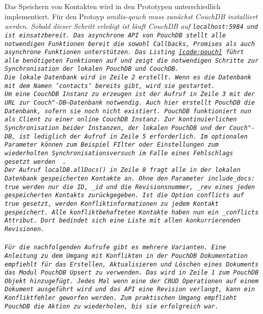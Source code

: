 Das Speichern von Kontakten wird in den Prototypen unterschiedlich implementiert.
%
%
Für den Protoyp \it{amilia-qouch} muss zunächst CouchDB installiert werden.
Sobald dieser Schritt erledigt ist läuft CouchDB auf \tt{localhost:5984} und ist einsatzbereit.
Das asynchrone \gls{API} von PouchDB stellt alle notwendigen Funktionen bereit die sowohl Callbacks, Promises als auch asynchrone Funktionen unterstützen. 
Das Listing \ref{code:pouch} führt alle benötigeten Funktionen auf und zeigt die notwendigen Schritte zur Synchronisation der lokalen PouchDB und CouchDB.\\
Die lokale Datenbank wird in Zeile 2 erstellt. Wenn es die Datenbank mit dem Namen `contacts` bereits gibt, wird sie gestartet.\\
Um eine CouchDB Instanz zu erzeugen ist der Aufruf in Zeile 3 mit der URL zur Couch"-DB--Datenbank notwendig. Auch hier erstellt PouchDB die Datenbank, sofern sie noch nicht existiert. PouchDB funktioniert nun als Client zu einer online CouchDB Instanz.
Zur kontinuierlichen Synchronisation beider Instanzen, der lokalen PouchDB und der Couch"-DB, ist lediglich der Aufruf in Zeile 5 erforderlich. Im optionalen Parameter können zum Beispiel FIlter oder Einstellungen zum wiederholten Synchronisationsversuch im Falle eines Fehlschlags gesetzt werden ~\cite{pouch_options}.\\
Der Aufruf \tt{localDB.allDocs()} in Zeile 8 fragt alle in der lokalen Datenbank gespeicherten Kontakte an.
Ohne den Parameter \tt{include\_docs: true} werden nur die ID, \tt{\_id} und die Revisionsnummer, \tt{\_rev} eines jeden gespeicherten Kontakts zurückgegeben.
Ist die Option \tt{conflicts} auf \tt{true} gesetzt, werden Konfliktinformationen zu jedem Kontakt gespeichert. Alle konfliktbehafteten Kontakte haben nun ein \tt{\_conflicts} Attribut. Dort bedindet sich eine Liste mit allen konkurrierenden Revisionen.\\\\
%
Für die nachfolgenden Aufrufe gibt es mehrere Varianten. Eine Anleitung zu dem Umgang mit Konflikten in der PouchDB Dokumentation empfiehlt für das Erstellen, Aktualisieren und Löschen eines Dokuments das Modul PouchDB Upsert zu verwenden. Das wird in Zeile 1 zum PouchDB Objekt hinzugefügt.
Jedes Mal wenn eine der \gls{CRUD} Operationen auf einem Dokument ausgeführt wird und das \gls{API} eine Revision verlangt, kann ein Konfliktfehler geworfen werden. Zum praktischen Umgang empflieht PouchDB die Aktion zu wiederholen, bis sie erfolgreich war.
